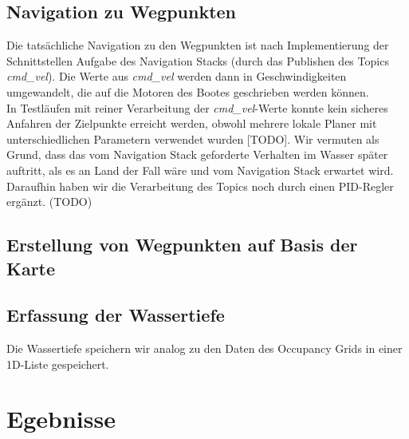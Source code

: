 \documentclass[conference]{IEEEtran}
\begin{document}
\subsection{Navigation zu Wegpunkten}
Die tatsächliche Navigation zu den Wegpunkten ist nach Implementierung der Schnittstellen Aufgabe des Navigation Stacks (durch das Publishen des Topics \textit{cmd\_vel}). Die Werte aus \textit{cmd\_vel} werden dann in Geschwindigkeiten umgewandelt, die auf die Motoren des Bootes geschrieben werden können.\\
In Testläufen mit reiner Verarbeitung der \textit{cmd\_vel}-Werte konnte kein sicheres Anfahren der Zielpunkte erreicht werden, obwohl mehrere lokale Planer mit unterschiedlichen Parametern verwendet wurden [TODO]. Wir vermuten als Grund, dass das vom Navigation Stack geforderte Verhalten im Wasser später auftritt, als es an Land der Fall wäre und vom Navigation Stack erwartet wird. Daraufhin haben wir die Verarbeitung des Topics noch durch einen PID-Regler ergänzt. (TODO)
\subsection{Erstellung von Wegpunkten auf Basis der Karte}
\subsection{Erfassung der Wassertiefe}
Die Wassertiefe speichern wir analog zu den Daten des Occupancy Grids in einer 1D-Liste gespeichert.

\section{Egebnisse}
\end{document}
